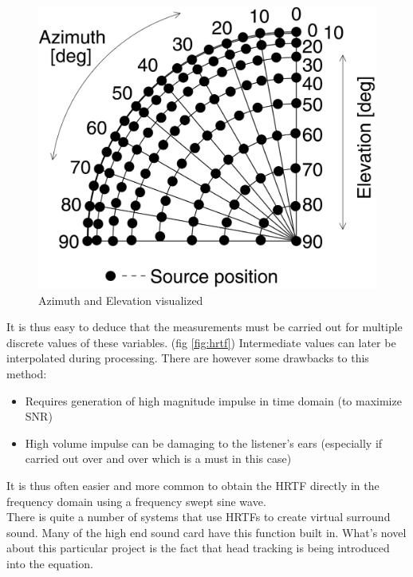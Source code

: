\documentclass[a4paper,12pt,oneside]{article}
\begin{document}
\begin{center}
\begin{figure}[H]
    \centering
\includegraphics[scale=0.7]{src.jpg}
    \caption{Azimuth and Elevation visualized}
    \label{fig:azel}
\end{figure}
\end{center}

It is thus easy to deduce that the measurements must be carried out for multiple discrete values of these variables. (fig \ref{fig:hrtf}) Intermediate values can later be interpolated during processing. There are however some drawbacks to this method: 
\begin{itemize}
\item Requires generation of high magnitude impulse in time domain (to maximize SNR)
\item High volume impulse can be damaging to the listener's ears (especially if carried out over and over which is a must in this case)
\end{itemize}
It is thus often easier and more common to obtain the HRTF directly in the frequency domain using a frequency swept sine wave.\\
There is quite a number of systems that use HRTFs to create virtual surround sound. Many of the high end sound card have this function built in. What's novel about this particular project is the fact that head tracking is being introduced into the equation.\cite{iid1}
\end{document}
